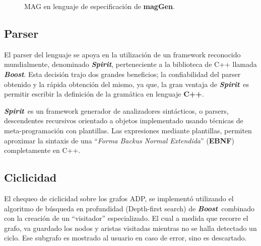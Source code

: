 \documentclass[runningheads,a4paper]{llncs}
\newcommand{\maggen}{\textbf{magGen}}
\newcommand{\boost}{\textit{\textbf{Boost}}}
\newcommand{\spirit}{\textit{\textbf{Spirit}}}
\begin{document}
\begin{figure}[!ht]
\vspace{-0.5cm}
\begin{minipage}{0.45\textwidth}
  \begin{center}

  \end{center}
\end{minipage}
\hspace{0.6cm}\begin{minipage}{0.45\textwidth}
  \begin{center}

  \end{center}
\end{minipage}
\vspace{-0,5cm}
\caption{\label{fig:MAG_traducida}MAG en lenguaje de especificación de \maggen.}
\end{figure}

\subsection{Parser}
\vspace{-0.22cm}
El parser del lenguaje se apoya en la utilización de un framework reconocido mundialmente, denominado \spirit, perteneciente a la biblioteca de C++ llamada \boost. Esta decisión trajo dos grandes beneficios; la confiabilidad del parser obtenido y la rápida obtención del mismo, ya que, la gran ventaja de \spirit\ es permitir escribir la definición de la gramática en lenguaje \textbf{C++}.

\spirit\ es un framework generador de analizadores sintácticos, o parsers, descendentes recursivos orientado a objetos implementado usando técnicas de meta-programación con plantillas. Las expresiones mediante plantillas, permiten aproximar la sintaxis de una ``\textit{\textit{Forma Backus Normal Extendida}}'' (\textbf{EBNF}) completamente en C++.

\subsection{Ciclicidad}
\vspace{-0.22cm}
El chequeo de ciclicidad sobre los grafos ADP, se implementó utilizando el algoritmo de búsqueda en profundidad (Depth-first search) de \boost\ combinado con la creación de un ``visitador'' especializado. El cual a medida que recorre el grafo, va guardado los nodos y aristas visitadas mientras no se halla detectado un ciclo. Ese subgrafo es mostrado al usuario en caso de error, sino es descartado.
\end{document}
